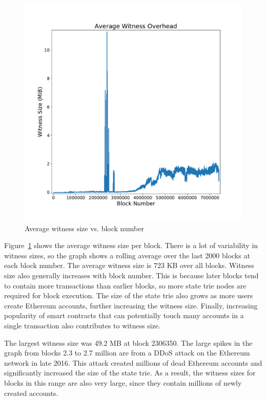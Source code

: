 \documentclass[12pt]{article}
\begin{document}
\begin{figure}[H]
  \centering
  \includegraphics[width=\textwidth]{../figures/results/graphs/background/witness-size.pdf}
  \caption{Average witness size vs. block number}
  \label{fig:witnesssize}
\end{figure}

Figure~\ref{fig:witnesssize} shows the average witness size per block. There is a lot of variability in witness sizes, so the graph shows a rolling average over the last 2000 blocks at each block number. The average witness size is 723 KB over all blocks. Witness size also generally increases with block number. This is because later blocks tend to contain more transactions than earlier blocks, so more state trie nodes are required for block execution. The size of the state trie also grows as more users create Ethereum accounts, further increasing the witness size. Finally, increasing popularity of smart contracts that can potentially touch many accounts in a single transaction also contributes to witness size.

The largest witness size was 49.2 MB at block 2306350. The large spikes in the graph from blocks 2.3 to 2.7 million are from a DDoS attack on the Ethereum network in late 2016. This attack created millions of dead Ethereum accounts and significantly increased the size of the state trie. As a result, the witness sizes for blocks in this range are also very large, since they contain millions of newly created accounts.
\end{document}
